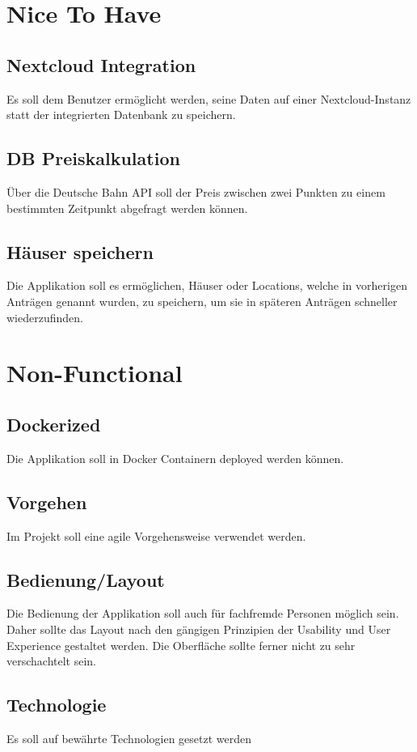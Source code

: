 \section{Nice To Have}\label{sec:nice-to-have}
\subsection{Nextcloud Integration}\label{subsec:nextcloud-integration}
Es soll dem Benutzer ermöglicht werden, seine Daten auf einer Nextcloud-Instanz statt der integrierten Datenbank zu speichern.
\subsection{DB Preiskalkulation}\label{subsec:db-preiskalkulation}
Über die Deutsche Bahn \ac{API} soll der Preis zwischen zwei Punkten zu einem bestimmten Zeitpunkt abgefragt werden können.
\subsection{Häuser speichern}\label{subsec:hauser-speichern}
Die Applikation soll es ermöglichen, Häuser oder Locations, welche in vorherigen Anträgen genannt wurden, zu speichern,
um sie in späteren Anträgen schneller wiederzufinden.


\section{Non-Functional}\label{sec:non-functional}
\subsection{Dockerized}\label{subsec:dockerized}
Die Applikation soll in Docker Containern deployed werden können.
\subsection{Vorgehen}\label{subsec:vorgehen}
Im Projekt soll eine agile Vorgehensweise verwendet werden.
\subsection{Bedienung/Layout}\label{subsec:bedienung/layout}
Die Bedienung der Applikation soll auch für fachfremde Personen möglich sein.
Daher sollte das Layout nach den gängigen Prinzipien der Usability und User Experience gestaltet werden.
Die Oberfläche sollte ferner nicht zu sehr verschachtelt sein.
\subsection{Technologie}\label{subsec:technologie}
Es soll auf bewährte Technologien gesetzt werden

